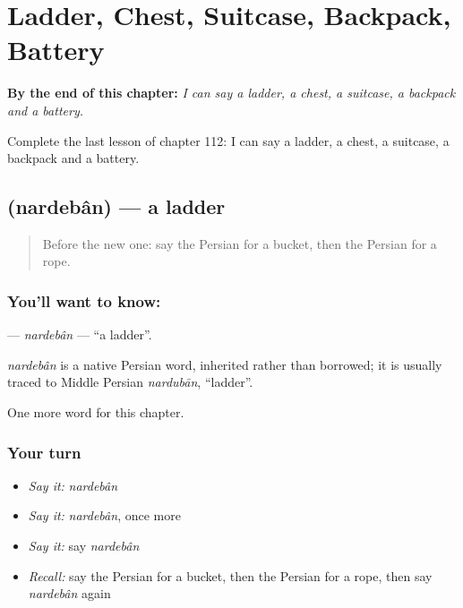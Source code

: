 
\chapter{Ladder, Chest, Suitcase, Backpack, Battery}
\label{ch:fa-ladder-chest-suitcase-backpack-battery}

\begin{chapteropening}
\textbf{By the end of this chapter:} \emph{I can say a ladder, a chest, a suitcase, a backpack and a battery.}

Complete the last lesson of chapter 112: I can say a ladder, a chest, a suitcase, a backpack and a battery.
\end{chapteropening}

\section[\texorpdfstring{\fa{نردبان} (nardebân)}{نردبان (nardebân)}]{ (nardebân) — a ladder}

\label{lesson:FA-C112-nardeban}



\begin{quote}
Before the new one: say the Persian for a bucket, then the Persian for a rope.
\end{quote}

\subsection*{You'll want to know: }
\textbf{} — \emph{nardebân} — \textquotedblleft{}a ladder\textquotedblright{}.

\begin{cousinweb}
\emph{nardebân} is a native Persian word, inherited rather than borrowed; it is usually traced to Middle Persian \emph{nardubān}, \textquotedblleft{}ladder\textquotedblright{}.
\end{cousinweb}

\begin{grammarlens}[title={What you've built}]
One more word for this chapter.
\end{grammarlens}

\subsection*{Your turn}
\begin{itemize}
\raggedright
  \item \emph{Say it:} \emph{nardebân}
  \item \emph{Say it:} \emph{nardebân}, once more
  \item \emph{Say it:} say \emph{nardebân}
  \item \emph{Recall:} say the Persian for a bucket, then the Persian for a rope, then say \emph{nardebân} again
\end{itemize}

